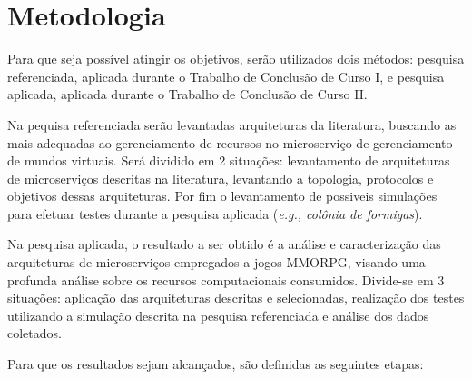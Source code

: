 \section{Metodologia}
\label{met}

Para que seja poss\'{i}vel atingir os objetivos, serão utilizados dois métodos: pesquisa referenciada, aplicada durante o Trabalho de Conclusão de Curso I, e pesquisa aplicada, aplicada durante o Trabalho de Conclusão de Curso II.

Na pequisa referenciada serão levantadas arquiteturas da literatura, buscando as mais adequadas ao gerenciamento de recursos no microserviço de gerenciamento de mundos virtuais. Será dividido em 2 situações: levantamento de arquiteturas de microserviços descritas na literatura, levantando a topologia, protocolos e objetivos dessas arquiteturas. Por fim o levantamento de possiveis simulações para efetuar testes durante a pesquisa aplicada (\textit{e.g., colônia de formigas}).

Na pesquisa aplicada, o resultado a ser obtido é a análise e caracterização das arquiteturas de microserviços empregados a jogos MMORPG, visando uma profunda análise sobre os recursos computacionais consumidos. Divide-se em 3 situações: aplicação das arquiteturas descritas e selecionadas, realização dos testes utilizando a simulação descrita na pesquisa referenciada e análise dos dados coletados.

Para que os resultados sejam alcançados, são definidas as seguintes etapas:

